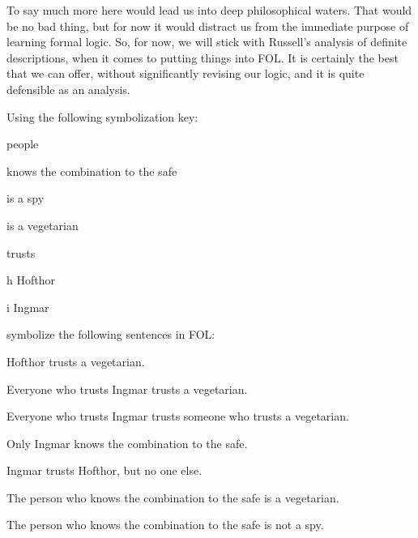 To say much more here would lead us into deep philosophical waters. That would be no bad thing, but for now it would distract us from the immediate purpose of learning formal logic. So, for now, we will stick with Russell's analysis of definite descriptions, when it comes to putting things into FOL. It is certainly the best that we can offer, without significantly revising our logic, and it is quite defensible as an analysis.

\practiceproblems

\problempart
Using the following symbolization key:
\begin{ekey}
\item[\text{domain}] people
\item[\atom{K}{x}]  knows the combination to the safe
\item[\atom{S}{x}]  is a spy
\item[\atom{V}{x}]  is a vegetarian
\item[\atom{T}{x,y}]  trusts 
\item[h] Hofthor
\item[i] Ingmar
\end{ekey}
symbolize the following sentences in FOL:
\begin{compactlist}
\item Hofthor trusts a vegetarian.
\item Everyone who trusts Ingmar trusts a vegetarian.
\item Everyone who trusts Ingmar trusts someone who trusts a vegetarian.
\item Only Ingmar knows the combination to the safe.
\item Ingmar trusts Hofthor, but no one else.
\item The person who knows the combination to the safe is a vegetarian.
\item The person who knows the combination to the safe is not a spy.
\end{compactlist}


